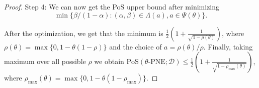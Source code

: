 \begin{proof}
Step 4: We can now get the PoS upper bound after minimizing $$\min \{\beta/(1-\alpha): (\alpha,\beta) \in \Lambda(a), a \in \Psi(\theta)\}.$$ 

After the optimization, we get that the minimum is $\frac{1}{2}\left( 1+ \frac{1}{\sqrt{1- \rho(\theta)}}\right)$, where $\rho(\theta) = \max \{0, 1-\theta(1-\rho)\}$ and the choice of $a= \rho(\theta)/\rho$. Finally, taking maximum over all possible $\rho$ we obtain  $\text{PoS}(\theta\text{-PNE};\mathcal{D})\leq \frac{1}{2}\left( 1+ \frac{1}{\sqrt{1- \rho_{\max}(\theta)}}\right)$, where $\rho_{\max}(\theta) = \max \{0, 1-\theta(1-\rho_{\max})\}$.

\end{proof}



